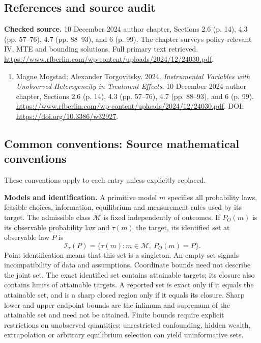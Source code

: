 \documentclass[11pt,a4paper]{article}
\begin{document}
\subsection*{References and source audit}
\textbf{Checked source.} 10 December 2024 author chapter, Sections 2.6 (p. 14), 4.3 (pp. 57--76), 4.7 (pp. 88--93), and 6 (p. 99). The chapter surveys policy-relevant IV, MTE and bounding solutions. Full primary text retrieved. \url{https://www.rfberlin.com/wp-content/uploads/2024/12/24030.pdf}.
\begin{enumerate}\raggedright
\item\hypertarget{definitions:source:30007706:1}{} Magne Mogstad; Alexander Torgovitsky. 2024. \emph{Instrumental Variables with Unobserved Heterogeneity in Treatment Effects}. 10 December 2024 author chapter, Sections 2.6 (p. 14), 4.3 (pp. 57--76), 4.7 (pp. 88--93), and 6 (p. 99).
\url{https://www.rfberlin.com/wp-content/uploads/2024/12/24030.pdf}.
DOI: \url{https://doi.org/10.3386/w32927}.
\end{enumerate}

\subsection*{Common conventions: Source mathematical conventions}

These conventions apply to each entry unless explicitly replaced.

\textbf{Models and identification.} A primitive model \(m\) specifies all probability laws, feasible choices, information, equilibrium and measurement rules used by its target. The admissible class \(\mathcal M\) is fixed independently of outcomes. If \(P_O(m)\) is its observable probability law and \(\tau(m)\) the target, its identified set at observable law \(P\) is
\[
 \mathcal I_\tau(P)=\{\tau(m):m\in\mathcal M,\ P_O(m)=P\}.
\]
Point identification means that this set is a singleton. An empty set signals incompatibility of data and assumptions. Coordinate bounds need not describe the joint set. The exact identified set contains attainable targets; its closure also contains limits of attainable targets. A reported set is exact only if it equals the attainable set, and is a sharp closed region only if it equals its closure. Sharp lower and upper endpoint bounds are the infimum and supremum of the attainable set and need not be attained. Finite bounds require explicit restrictions on unobserved quantities; unrestricted confounding, hidden wealth, extrapolation or arbitrary equilibrium selection can yield uninformative sets.
\end{document}
